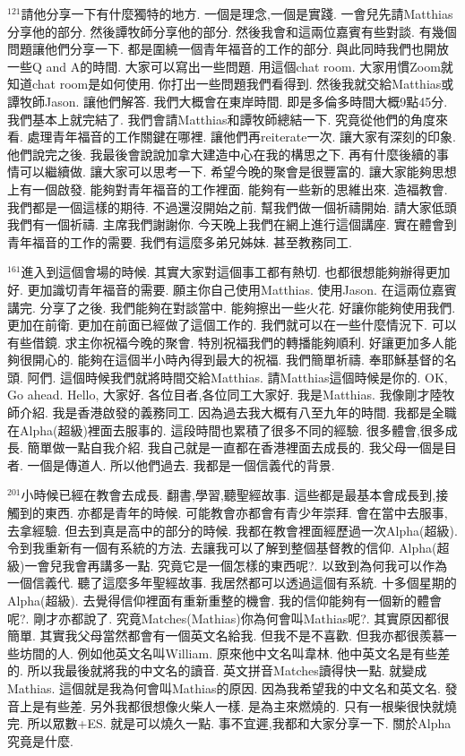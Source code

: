 \documentclass{book}
\begin{document}
$^{121}$請他分享一下有什麼獨特的地方.
一個是理念,一個是實踐.
一會兒先請Matthias分享他的部分.
然後譚牧師分享他的部分.
然後我會和這兩位嘉賓有些對談.
有幾個問題讓他們分享一下.
都是圍繞一個青年福音的工作的部分.
與此同時我們也開放一些Q and A的時間.
大家可以寫出一些問題.
用這個chat room.
大家用慣Zoom就知道chat room是如何使用.
你打出一些問題我們看得到.
然後我就交給Matthias或譚牧師Jason.
讓他們解答.
我們大概會在東岸時間.
即是多倫多時間大概9點45分.
我們基本上就完結了.
我們會請Matthias和譚牧師總結一下.
究竟從他們的角度來看.
處理青年福音的工作關鍵在哪裡.
讓他們再reiterate一次.
讓大家有深刻的印象.
他們說完之後.
我最後會說說加拿大建造中心在我的構思之下.
再有什麼後續的事情可以繼續做.
讓大家可以思考一下.
希望今晚的聚會是很豐富的.
讓大家能夠思想上有一個啟發.
能夠對青年福音的工作裡面.
能夠有一些新的思維出來.
造福教會.
我們都是一個這樣的期待.
不過還沒開始之前.
幫我們做一個祈禱開始.
請大家低頭我們有一個祈禱.
主席我們謝謝你.
今天晚上我們在網上進行這個講座.
實在體會到青年福音的工作的需要.
我們有這麼多弟兄姊妹.
甚至教務同工.

$^{161}$進入到這個會場的時候.
其實大家對這個事工都有熱切.
也都很想能夠辦得更加好.
更加識切青年福音的需要.
願主你自己使用Matthias.
使用Jason.
在這兩位嘉賓講完.
分享了之後.
我們能夠在對談當中.
能夠擦出一些火花.
好讓你能夠使用我們.
更加在前衛.
更加在前面已經做了這個工作的.
我們就可以在一些什麼情況下.
可以有些借鏡.
求主你祝福今晚的聚會.
特別祝福我們的轉播能夠順利.
好讓更加多人能夠很開心的.
能夠在這個半小時內得到最大的祝福.
我們簡單祈禱.
奉耶穌基督的名頭.
阿們.
這個時候我們就將時間交給Matthias.
請Matthias這個時候是你的.
OK, Go ahead.
Hello, 大家好.
各位目者,各位同工大家好.
我是Matthias.
我像剛才陸牧師介紹.
我是香港啟發的義務同工.
因為過去我大概有八至九年的時間.
我都是全職在Alpha(超級)裡面去服事的.
這段時間也累積了很多不同的經驗.
很多體會,很多成長.
簡單做一點自我介紹.
我自己就是一直都在香港裡面去成長的.
我父母一個是目者.
一個是傳道人.
所以他們過去.
我都是一個信義代的背景.

$^{201}$小時候已經在教會去成長.
翻書,學習,聽聖經故事.
這些都是最基本會成長到,接觸到的東西.
亦都是青年的時候.
可能教會亦都會有青少年崇拜.
會在當中去服事,去拿經驗.
但去到真是高中的部分的時候.
我都在教會裡面經歷過一次Alpha(超級).
令到我重新有一個有系統的方法.
去讓我可以了解到整個基督教的信仰.
Alpha(超級)一會兒我會再講多一點.
究竟它是一個怎樣的東西呢?.
以致到為何我可以作為一個信義代.
聽了這麼多年聖經故事.
我居然都可以透過這個有系統.
十多個星期的Alpha(超級).
去覺得信仰裡面有重新重整的機會.
我的信仰能夠有一個新的體會呢?.
剛才亦都說了.
究竟Matches(Mathias)你為何會叫Mathias呢?.
其實原因都很簡單.
其實我父母當然都會有一個英文名給我.
但我不是不喜歡.
但我亦都很羨慕一些坊間的人.
例如他英文名叫William.
原來他中文名叫韋林.
他中英文名是有些差的.
所以我最後就將我的中文名的讀音.
英文拼音Matches讀得快一點.
就變成Mathias.
這個就是我為何會叫Mathias的原因.
因為我希望我的中文名和英文名.
發音上是有些差.
另外我都很想像火柴人一樣.
是為主來燃燒的.
只有一根柴很快就燒完.
所以眾數+ES.
就是可以燒久一點.
事不宜遲,我都和大家分享一下.
關於Alpha究竟是什麼.
\end{document}
